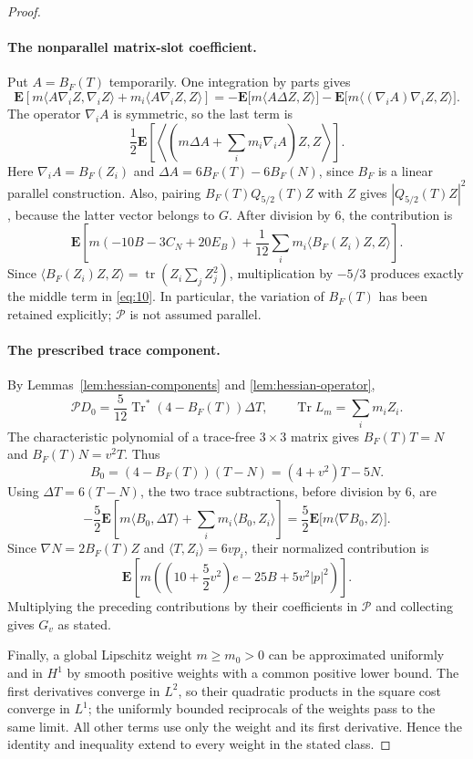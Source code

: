 \begin{proof}
\paragraph{The nonparallel matrix-slot coefficient.}
Put \(A=B_F(T)\) temporarily.  One integration by parts gives
\[
 \mathbf E\left[m\langle A\nabla_iZ,\nabla_iZ\rangle
              +m_i\langle A\nabla_iZ,Z\rangle\right]
 =-\mathbf E\bigl[m\langle A\Delta Z,Z\rangle\bigr]
  -\mathbf E\bigl[m\langle(\nabla_iA)\nabla_iZ,Z\rangle\bigr].
\]
The operator \(\nabla_iA\) is symmetric, so the last term is
\[
 \frac12\mathbf E\left[
 \left\langle\left(m\Delta A+\sum_i m_i\nabla_iA\right)Z,Z\right\rangle
 \right].
\]
Here \(\nabla_iA=B_F(Z_i)\) and
\(\Delta A=6B_F(T)-6B_F(N)\), since \(B_F\) is a linear parallel
construction.  Also, pairing \(B_F(T)Q_{5/2}(T)Z\) with \(Z\) gives
\(|Q_{5/2}(T)Z|^2\), because the latter vector belongs to
\(G\).  After division by \(6\), the contribution is
\[
 \mathbf E\left[
 m(-10B-3C_N+20E_B)
 +\frac1{12}\sum_i m_i\langle B_F(Z_i)Z,Z\rangle\right].
\]
Since
\(\langle B_F(Z_i)Z,Z\rangle
  =\operatorname{tr}(Z_i\sum_jZ_j^2)\),
multiplication by \(-5/3\) produces exactly the middle term in
\eqref{eq:10}.  In particular, the variation of \(B_F(T)\) has been
retained explicitly; \(\mathcal P\) is not assumed parallel.

\paragraph{The prescribed trace component.}
By Lemmas~\ref{lem:hessian-components} and \ref{lem:hessian-operator},
\[
 \mathcal PD_0=\frac5{12}\operatorname{Tr}^*(4-B_F(T))\Delta T,
 \qquad \operatorname{Tr}L_m=\sum_i m_iZ_i.
\]
The characteristic polynomial of a trace-free \(3\times3\) matrix gives
\(B_F(T)T=N\) and \(B_F(T)N=v^2T\).  Thus
\[
 B_0=(4-B_F(T))(T-N)=(4+v^2)T-5N.
\]
Using \(\Delta T=6(T-N)\), the two trace subtractions, before division
by \(6\), are
\[
 -\frac52\mathbf E\left[
 m\langle B_0,\Delta T\rangle+\sum_i m_i\langle B_0,Z_i\rangle\right]
 =\frac52\mathbf E\bigl[m\langle\nabla B_0,Z\rangle\bigr].
\]
Since \(\nabla N=2B_F(T)Z\) and
\(\langle T,Z_i\rangle=6vp_i\), their normalized contribution is
\[
 \mathbf E\left[
 m\left(\left(10+\frac52v^2\right)e-25B+5v^2|p|^2\right)\right].
\]
Multiplying the preceding contributions by their coefficients in
\(\mathcal P\) and collecting gives \(G_v\) as stated.

Finally, a global Lipschitz weight $m\ge m_0>0$ can be approximated
uniformly and in $H^1$ by smooth positive weights with a common positive
lower bound. The first derivatives converge in $L^2$, so their quadratic
products in the square cost converge in $L^1$; the uniformly bounded
reciprocals of the weights pass to the same limit. All other terms use
only the weight and its first derivative. Hence the identity and inequality
extend to every weight in the stated class.
\end{proof}


